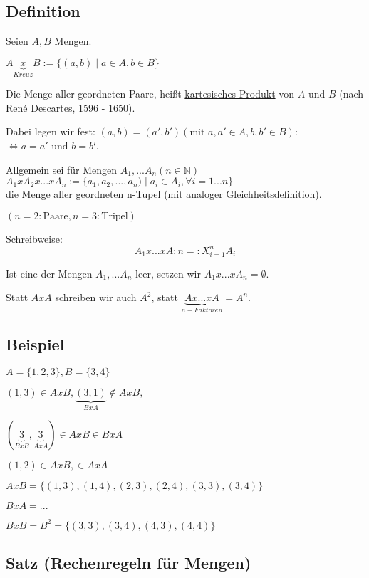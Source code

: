 \documentclass[a4paper, 12pt, twoside] {article}
\begin{document}
\subsection{Definition}
Seien $A, B$ Mengen.

$A \underbrace{x}_{Kreuz} B := \{(a, b) \mid a \in A, b \in B\}$

Die Menge aller geordneten Paare, heißt \underline{kartesisches Produkt} von $A$ und $B$ (nach René Descartes, 1596 - 1650).

Dabei legen wir fest: $(a, b) = (a', b') (\text{mit } a, a' \in A, b, b' \in B):$ \\
$\Leftrightarrow a = a' \text{ und } b = b‘$.

Allgemein sei für Mengen $A_1, ... A_n (n \in \mathbb{N})$ \\
$A_1 x A_2 x ... x A_n := \{a_1, a_2, ..., a_n) \mid a_i \in A_i, \forall i = 1 ... n\}$ \\
die Menge aller \underline{geordneten n-Tupel} (mit analoger Gleichheitsdefinition).

$(n = 2: \text{Paare}, n = 3: \text{Tripel})$

Schreibweise: \\
$$A_1 x ... x A:n =: X_{i=1}^{n} A_i$$ %

Ist eine der Mengen $A_1, ... A_n$ leer, setzen wir $A_1 x ... x A_n = \emptyset$.

Statt $A x A$ schreiben wir auch $A^2$, statt $\underbrace{A x ... x A}_{n-Faktoren} = A^n$.


\subsection{Beispiel}
$A = \{1, 2, 3\}, B = \{3, 4\}$

$(1, 3) \in A x B, \underbrace{(3, 1)}_{B x A} \notin A x B,$

$(\underbrace{3}_{B x B}, \underbrace{3}_{A x A}) \in A x B\in B x A$

$(1, 2) \in A x B, \in A x A$

$A x B = \{(1, 3), (1, 4), (2, 3), (2, 4), (3, 3), (3, 4)\}$

$B x A = ...$

$B x B = B^2 = \{(3, 3), (3, 4), (4, 3), (4, 4)\}$


\subsection{Satz (Rechenregeln für Mengen)}
\end{document}
